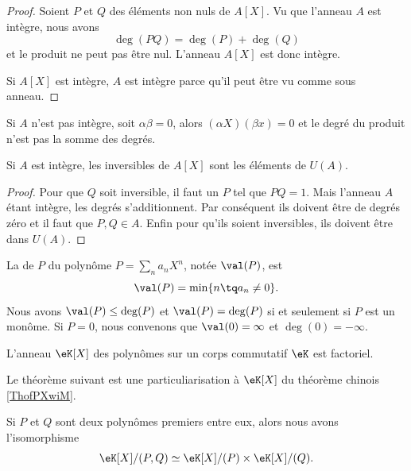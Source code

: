 \begin{proof}
    Soient \( P\) et \( Q\) des éléments non nuls de \( A[X]\). Vu que l'anneau \( A\) est intègre, nous avons
    \begin{equation}
        \deg(PQ)=\deg(P)+\deg(Q)
    \end{equation}
    et le produit ne peut pas être nul. L'anneau \( A[X]\) est donc intègre.

    Si \( A[X]\) est intègre, \( A\) est intègre parce qu'il peut être vu comme sous anneau.
\end{proof}

\begin{remark}
    Si \( A\) n'est pas intègre, soit \( \alpha\beta=0\), alors \( (\alpha X)(\beta x)=0\) et le degré du produit n'est pas la somme des degrés.
\end{remark}

\begin{corollary}
    Si \( A\) est intègre, les inversibles de \( A[X]\) sont les éléments de \( U(A)\).
\end{corollary}

\begin{proof}
    Pour que \( Q\) soit inversible, il faut un \( P\) tel que \( PQ=1\). Mais l'anneau \( A\) étant intègre, les degrés s'additionnent. Par conséquent ils doivent être de degrés zéro et il faut que \( P,Q\in A\). Enfin pour qu'ils soient inversibles, ils doivent être dans \( U(A)\).
\end{proof}

La  de \( P\) du polynôme \( P=\sum_n a_nX^n\), notée \( \val(P)\), est 
\begin{equation}
    \val(P)=\min\{ n\tq a_n\neq 0 \}.
\end{equation}
Nous avons \( \val(P)\leq \deg(P)\) et \( \val(P)=\deg(P)\) si et seulement si \( P\) est un monôme. Si \( P=0\), nous convenons que \( \val(0)=\infty\) et \( \deg(0)=-\infty\).

\begin{proposition}     \label{PropqGZXvr}
    L'anneau \( \eK[X]\) des polynômes sur un corps commutatif \( \eK\) est factoriel.
\end{proposition}

Le théorème suivant est une particuliarisation à \( \eK[X]\) du théorème chinois \ref{ThofPXwiM}.
\begin{theorem}
    Si \( P\) et \( Q\) sont deux polynômes premiers entre eux, alors nous avons l'isomorphisme
    \begin{equation}
        \eK[X]/(P,Q)\simeq\eK[X]/(P)\times \eK[X]/(Q).
    \end{equation}
\end{theorem}

